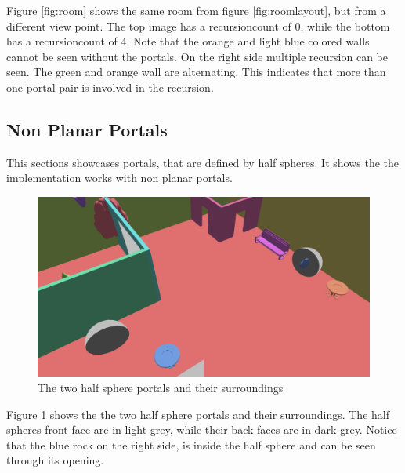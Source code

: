 Figure \ref{fig:room} shows the same room from figure \ref{fig:roomlayout}, but from a different view point. The top image has a \gls{recursioncount} of 0, while the bottom has a \gls{recursioncount} of 4. Note that the orange and light blue colored walls cannot be seen without the portals. On the right side multiple recursion can be seen. The green and orange wall are alternating. This indicates that more than one portal pair is involved in the recursion.

\subsection{Non Planar Portals}
\label{section:nonplanar}

This sections showcases portals, that are defined by half spheres. It shows the the implementation works with non planar portals.

\begin{figure}[H]
	\includegraphics[width=\linewidth]{images/nonplanarlayout.png}
	\caption{The two half sphere portals and their surroundings}
	\label{fig:nonplanarlayout}
\end{figure}

Figure \ref{fig:nonplanarlayout} shows the the two half sphere portals and their surroundings. The half spheres front face are in light grey, while their back faces are in dark grey. Notice that the blue rock on the right side, is inside the half sphere and can be seen through its opening.

